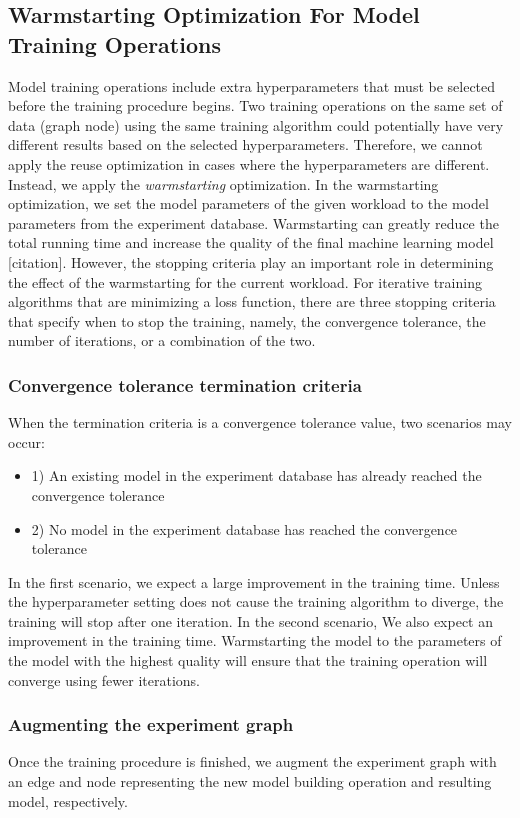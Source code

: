 \subsection{Warmstarting Optimization For Model Training Operations}
Model training operations include extra hyperparameters that must be selected before the training procedure begins.
Two training operations on the same set of data (graph node) using the same training algorithm could potentially have very different results based on the selected hyperparameters.
Therefore, we cannot apply the reuse optimization in cases where the hyperparameters are different.
Instead, we apply the \textit{warmstarting} optimization.
In the warmstarting optimization, we set the model parameters of the given workload to the model parameters from the experiment database.
Warmstarting can greatly reduce the total running time and increase the quality of the final machine learning model [citation].
However, the stopping criteria play an important role in determining the effect of the warmstarting for the current workload.
For iterative training algorithms that are minimizing a loss function, there are three stopping criteria that specify when to stop the training, namely, the convergence tolerance, the number of iterations, or a combination of the two.

\subsubsection{Convergence tolerance termination criteria}
When the termination criteria is a convergence tolerance value, two scenarios may occur:
\begin{itemize}
\item 1) An existing model in the experiment database has already reached the convergence tolerance
\item 2) No model in the experiment database has reached the convergence tolerance
\end{itemize}
In the first scenario, we expect a large improvement in the training time. 
Unless the hyperparameter setting does not cause the training algorithm to diverge, the training will stop after one iteration.
In the second scenario, We also expect an improvement in the training time.
Warmstarting the model to the parameters of the model with the highest quality will ensure that the training operation will converge using fewer iterations.

\subsubsection{Augmenting the experiment graph}
Once the training procedure is finished, we augment the experiment graph with an edge and node representing the new model building operation and resulting model, respectively.

